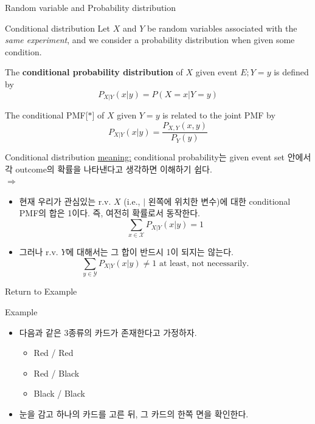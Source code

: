 \documentclass[9pt]{beamer}
\begin{document}
\begin{section}{Random variable and Probability distribution}
      \begin{frame}{Conditional distribution}
        Let $X$ and $Y$ be random variables associated with the \textit{same experiment}, and we consider a probability distribution when given some \alert{condition}.
        \begin{definition}
          The \textbf{conditional probability distribution} of $X$ \alert{given event} $E; Y=y$ is defined by 
          $$P_{X|Y}(x|y) = P(X=x| Y=y)$$
        \end{definition}
        \begin{theorem}
          The conditional PMF[$\ast$] of $X$ given $Y = y$ is related to the joint PMF by
          $$P_{X|Y}(x|y) = \frac{P_{X,Y}(x,y)}{P_Y(y)}$$
        \end{theorem}
      \end{frame}
      \begin{frame}{Conditional distribution}
        \checkmark \underline{meaning:} conditional probability는 given event \alert{set} 안에서 각 outcome의 확률을 나타낸다고 생각하면 이해하기 쉽다. \\ $\Rightarrow$
        \vspace{2cm}
        \begin{itemize}
          \item 현재 우리가 관심있는 r.v. $X$ (i.e., $|$ 왼쪽에 위치한 변수)에 대한 conditional PMF의 합은 1이다. 즉, 여전히 확률로서 동작한다.
          $$\sum_{x \in \mathcal X} P_{X|Y}(x|y) = 1$$
          \item 그러나 r.v. $Y$에 대해서는 그 합이 반드시 1이 되지는 않는다. 
          $$\sum_{y \in \mathcal Y} P_{X|Y}(x|y) \ne 1 \text{ at least, not necessarily.}$$
        \end{itemize}
      \end{frame}
      \begin{frame}{Return to Example}
        \begin{block}{Example}
        \begin{itemize}
          \item 다음과 같은 3종류의 카드가 존재한다고 가정하자.
          \begin{itemize}
            \item Red / Red
            \item Red / Black
            \item Black / Black
          \end{itemize}
          \item 눈을 감고 하나의 카드를 고른 뒤, 그 카드의 한쪽 면을 확인한다.

\end{itemize}
\end{block}
\end{frame}
\end{section}
\end{document}
